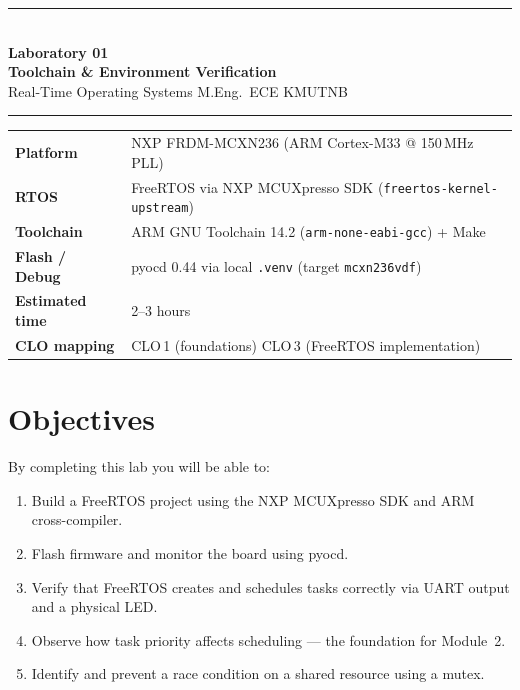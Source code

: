 \documentclass[11pt, a4paper]{article}
\begin{document}
\begin{center}
  {\color{kmutnbBlue}\rule{\linewidth}{2pt}}\\[6pt]
  {\LARGE\bfseries\color{kmutnbBlue} Laboratory 01}\\[4pt]
  {\large\bfseries Toolchain \& Environment Verification}\\[2pt]
  {\normalsize Real-Time Operating Systems \enspace\textbullet\enspace
   M.Eng.\ ECE \enspace\textbullet\enspace KMUTNB}\\[8pt]
  {\color{kmutnbGold}\rule{\linewidth}{1pt}}
\end{center}

\vspace{0.3cm}

\begin{tabular}{@{}p{3.8cm} p{10cm}@{}}
  \textbf{Platform}       & NXP FRDM-MCXN236 (ARM Cortex-M33 @ 150\,MHz PLL) \\[2pt]
  \textbf{RTOS}           & FreeRTOS via NXP MCUXpresso SDK (\texttt{freertos-kernel-upstream}) \\[2pt]
  \textbf{Toolchain}      & ARM GNU Toolchain 14.2 (\texttt{arm-none-eabi-gcc}) + Make \\[2pt]
  \textbf{Flash / Debug}  & pyocd 0.44 via local \texttt{.venv} (target \texttt{mcxn236vdf}) \\[2pt]
  \textbf{Estimated time} & 2--3 hours \\[2pt]
  \textbf{CLO mapping}    & CLO\,1 (foundations) \enspace CLO\,3 (FreeRTOS implementation) \\
\end{tabular}

\vspace{0.4cm}

\section{Objectives}

By completing this lab you will be able to:

\begin{enumerate}[noitemsep, leftmargin=*]
  \item Build a FreeRTOS project using the NXP MCUXpresso SDK and ARM cross-compiler.
  \item Flash firmware and monitor the board using pyocd.
  \item Verify that FreeRTOS creates and schedules tasks correctly via UART output
        and a physical LED.
  \item Observe how task priority affects scheduling --- the foundation for Module~2.
  \item Identify and prevent a race condition on a shared resource using a mutex.
\end{enumerate}
\end{document}
